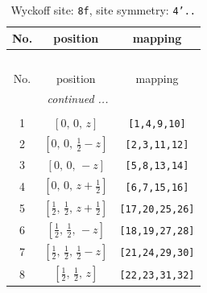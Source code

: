 \documentclass[fleqn,8pt]{jsarticle}
\begin{document}
\begin{longtable}{ccc}
\caption{Wyckoff site: {\tt 8f}, site symmetry: {\tt 4'..}}
 \\
 \hline \hline
No. & position & mapping \\ \hline \endfirsthead

\multicolumn{2}{l}{\tablename\ \thetable{}} \\
 \hline \hline
No. & position & mapping \\ \hline \endhead

 \hline \hline
\multicolumn{2}{r}{\footnotesize\it continued ...} \\ \endfoot

 \hline \hline
\multicolumn{2}{r}{} \\ \endlastfoot

1 & $\left[ 0,\, 0,\, z \right]$ & {\tt [1,4,9,10]} \\ \hline
2 & $\left[ 0,\, 0,\, \frac{1}{2} - z \right]$ & {\tt [2,3,11,12]} \\ \hline
3 & $\left[ 0,\, 0,\, - z \right]$ & {\tt [5,8,13,14]} \\ \hline
4 & $\left[ 0,\, 0,\, z + \frac{1}{2} \right]$ & {\tt [6,7,15,16]} \\ \hline
5 & $\left[ \frac{1}{2},\, \frac{1}{2},\, z + \frac{1}{2} \right]$ & {\tt [17,20,25,26]} \\ \hline
6 & $\left[ \frac{1}{2},\, \frac{1}{2},\, - z \right]$ & {\tt [18,19,27,28]} \\ \hline
7 & $\left[ \frac{1}{2},\, \frac{1}{2},\, \frac{1}{2} - z \right]$ & {\tt [21,24,29,30]} \\ \hline
8 & $\left[ \frac{1}{2},\, \frac{1}{2},\, z \right]$ & {\tt [22,23,31,32]} \\
\end{longtable}
\renewcommand{\arraystretch}{1.2}
\end{document}
